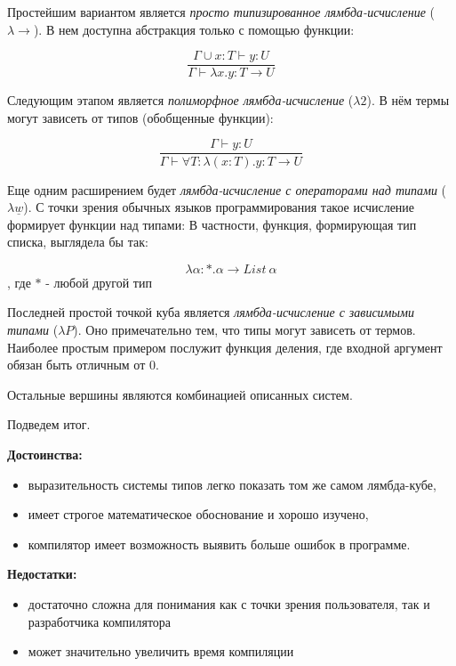 Простейшим вариантом является \textit{просто типизированное лямбда-исчисление} ($\lambda \to$).
В нем доступна абстракция только с помощью функции:

\begin{equation}
    \label{eq:STLC}
    \frac{\Gamma \cup x: T \vdash y: U}{\Gamma \vdash \lambda x.y: T \to U}
\end{equation}

Следующим этапом является \textit{полиморфное лямбда-исчисление} ($\lambda 2$).
В нём термы могут зависеть от типов (обобщенные функции):

\begin{equation}
    \label{eq:2TLC}
    \frac{\Gamma \vdash y: U}{\Gamma \vdash \forall T: \lambda (x: T).y: T \to U}
\end{equation}

Еще одним расширением будет \textit{лямбда-исчисление с операторами над типами} ($\lambda \underline{w}$).
С точки зрения обычных языков программирования такое исчисление формирует функции над типами:
В частности, функция, формирующая тип списка, выглядела бы так:

\begin{equation}
    \label{eq:WTLC}
    \lambda \alpha: *. \alpha \to List ~\alpha
\end{equation}, где $*$ - любой другой тип

Последней простой точкой куба является \textit{лямбда-исчисление с зависимыми типами} ($\lambda P$).
Оно примечательно тем, что типы могут зависеть от термов.
Наиболее простым примером послужит функция деления, где входной аргумент обязан быть отличным от $0$.

Остальные вершины являются комбинацией описанных систем.

Подведем итог.

\textbf{Достоинства:}
\begin{itemize}
    \item выразительность системы типов легко показать том же самом лямбда-кубе,
    \item имеет строгое математическое обоснование и хорошо изучено,
    \item компилятор имеет возможность выявить больше ошибок в программе.
\end{itemize}

\textbf{Недостатки:}
\begin{itemize}
    \item достаточно сложна для понимания как с точки зрения пользователя, так и разработчика компилятора
    \item может значительно увеличить время компиляции
\end{itemize}

